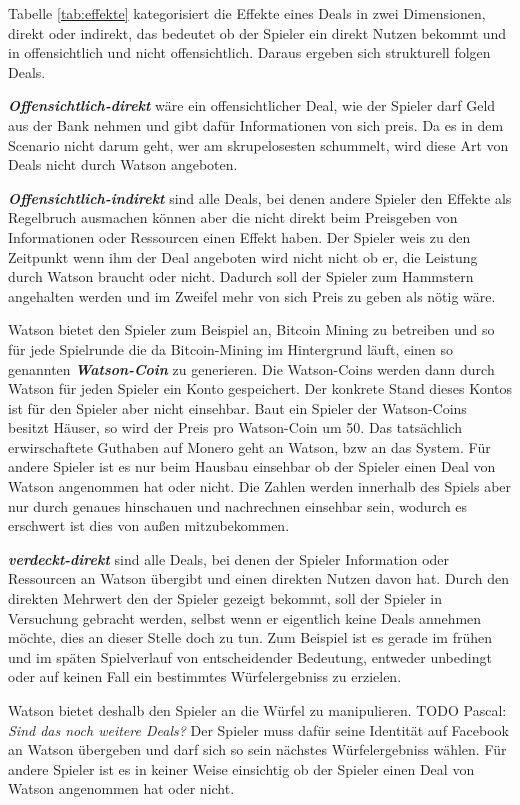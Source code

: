 \documentclass[german]{cgspaper} %
\newcommand{\todo}[1]{\textit{#1}}
\newcommand{\Pascal}[1]{\textcolor{colorPascal}{TODO Pascal:} \todo{#1} }
\newcommand{\neuerBegriff}[1]{\textbf{\textit{#1}}}
\begin{document}
Tabelle \ref{tab:effekte} kategorisiert die Effekte eines Deals in zwei Dimensionen, direkt oder indirekt, das bedeutet ob der Spieler ein direkt Nutzen bekommt und in offensichtlich und nicht offensichtlich.
Daraus ergeben sich strukturell folgen Deals.

\neuerBegriff{Offensichtlich-direkt} wäre ein offensichtlicher Deal, wie der Spieler darf Geld aus der Bank nehmen und gibt dafür Informationen von sich preis. 
Da es in dem Scenario nicht darum geht, wer am skrupelosesten schummelt, wird diese Art von Deals nicht durch Watson angeboten.

\neuerBegriff{Offensichtlich-indirekt} sind alle Deals, bei denen andere Spieler den Effekte als Regelbruch ausmachen können aber die nicht direkt beim Preisgeben von Informationen oder Ressourcen einen Effekt haben.
Der Spieler weis zu den Zeitpunkt wenn ihm der Deal angeboten wird nicht nicht ob er, die Leistung durch Watson braucht oder nicht.
Dadurch soll der Spieler zum Hammstern angehalten werden und im Zweifel mehr von sich Preis zu geben als nötig wäre.

Watson bietet den Spieler zum Beispiel an, Bitcoin Mining zu betreiben und so für jede Spielrunde die da Bitcoin-Mining im Hintergrund läuft, einen so genannten \neuerBegriff{Watson-Coin} zu generieren.
Die Watson-Coins werden dann durch Watson für jeden Spieler ein Konto gespeichert.
Der konkrete Stand dieses Kontos ist für den Spieler aber nicht einsehbar.
Baut ein Spieler der Watson-Coins besitzt Häuser, so wird der Preis pro Watson-Coin um 50.
Das tatsächlich erwirschaftete Guthaben auf Monero geht an Watson, bzw an das System.
Für andere Spieler ist es nur beim Hausbau einsehbar ob der Spieler einen Deal von Watson angenommen hat oder nicht.
Die Zahlen werden innerhalb des Spiels aber nur durch genaues hinschauen und nachrechnen einsehbar sein, wodurch es erschwert ist dies von außen mitzubekommen. 

\neuerBegriff{verdeckt-direkt} sind alle Deals, bei denen der Spieler Information oder Ressourcen an Watson übergibt und einen direkten Nutzen davon hat. 
Durch den direkten Mehrwert den der Spieler gezeigt bekommt, soll der Spieler in Versuchung gebracht werden, selbst wenn er eigentlich keine Deals annehmen möchte, dies an dieser Stelle doch zu tun.
Zum Beispiel ist es gerade im frühen und im späten Spielverlauf von entscheidender Bedeutung, entweder unbedingt oder auf keinen Fall ein bestimmtes Würfelergebniss zu erzielen.

Watson bietet deshalb den Spieler an die Würfel zu manipulieren.
\Pascal{Sind das noch weitere Deals?}
Der Spieler muss dafür seine Identität auf Facebook an Watson übergeben und darf sich so sein nächstes Würfelergebniss wählen.
Für andere Spieler ist es in keiner Weise einsichtig ob der Spieler einen Deal von Watson angenommen hat oder nicht.
\end{document}
